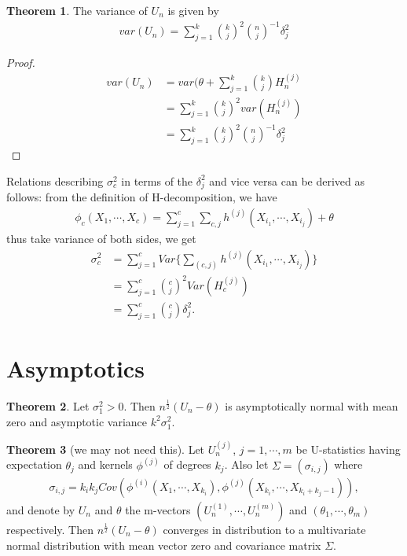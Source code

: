 \documentclass{article}
\theoremstyle{definition}
\newtheorem{theorem}{Theorem}
\numberwithin{Def}{section}
\begin{document}
\begin{itemize}
    
    \begin{theorem}
    The variance of $U_n$ is given by 
    \begin{align}
        var(U_n) = \sum_{j=1}^k {k \choose j}^2 {n \choose j}^{-1}\delta_j^2
    \end{align}
    \end{theorem}
    \begin{proof}
    \begin{align*}
        var(U_n) &= var(\theta + \sum_{j=1}^k {k \choose j}H_n^{(j)} \\
        &= \sum_{j=1}^k {k \choose j}^2var(H_n^{(j)})\\
        &= \sum_{j=1}^k {k \choose j}^2 {n \choose j}^{-1}\delta_j^2
    \end{align*}
    \end{proof}
    \end{itemize}
    Relations describing $\sigma_{c}^2$ in terms of the $\delta_j^2 $ and vice versa can be derived as follows: from the definition of H-decomposition, we have 
    \begin{align*}
        \phi_c (X_1, \cdots, X_c) = \sum_{j = 1}^c \sum_{c,j} h^{(j)} (X_{i_{1}}, \cdots , X_{i_j}) + \theta
    \end{align*}
    thus take variance of both sides, we get 
    \begin{align*}
        \sigma_{c}^2 &= \sum_{j = 1}^c Var\{ \sum_{(c, j)} h^{(j)} (X_{i_{1}}, \cdots , X_{i_j})\} \\
        &= \sum_{j = 1}^c {c \choose j}^2 Var( H_c^{(j)}) \\ 
        &= \sum_{j = 1}^c {c \choose j} \delta_j^2.
    \end{align*}
    
    \section{Asymptotics} 
    \begin{theorem}
    Let $\sigma_1^{2} > 0$. Then $n^{\frac{1}{2}}(U_n - \theta)$ is asymptotically normal with mean zero and asymptotic variance $k^2 \sigma_1^2$.
    \end{theorem}
    
    \begin{theorem}[we may not need this]
    Let $U_n^{(j)}$, $j = 1, \cdots, m$ be U-statistics having expectation $\theta_j$ and kernels $\phi^{(j)}$ of degrees $k_j$. Also let $\Sigma = (\sigma_{i,j})$ where 
    \begin{align*}
        \sigma_{i,j} = k_i k_j Cov(\phi^{(i)} (X_1, \cdots, X_{k_i}), \phi^{(j)} (X_{k_i}, \cdots, X_{k_i + k_j -1})),
    \end{align*}
    and denote by $U_n$ and $\theta$ the m-vectors $(U_n^{(1)}, \cdots, U_n^{(m)})$ and $(\theta_1, \cdots, \theta_m)$ respectively. Then $n^{\frac{1}{2}}(U_n - \theta)$ converges in distribution to a multivariate normal distribution with mean vector zero and covariance matrix $\Sigma$.
    \end{theorem}
    
\end{document}
